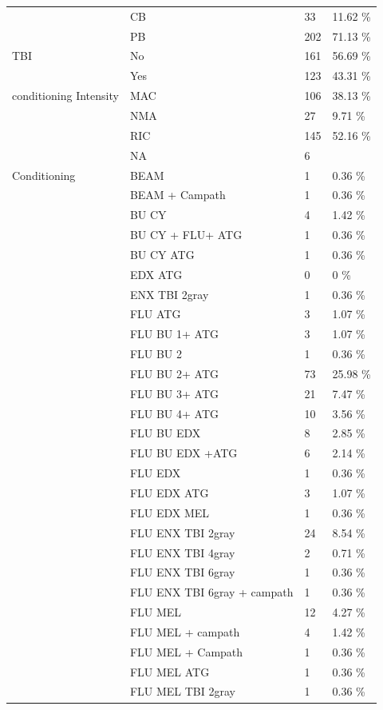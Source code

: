 \documentclass[a4paper,11pt] {article}
\begin{document}
\begin{longtable}{llll}
   & CB & 33 & 11.62 \% \\ 
   & PB & 202 & 71.13 \% \\ 
  TBI & No & 161 & 56.69 \% \\ 
   & Yes & 123 & 43.31 \% \\ 
  conditioning Intensity & MAC & 106 & 38.13 \% \\ 
   & NMA & 27 & 9.71 \% \\ 
   & RIC & 145 & 52.16 \% \\ 
   & NA & 6 &  \\ 
  Conditioning & BEAM & 1 & 0.36 \% \\ 
   & BEAM + Campath & 1 & 0.36 \% \\ 
   & BU CY  & 4 & 1.42 \% \\ 
   & BU CY + FLU+ ATG & 1 & 0.36 \% \\ 
   & BU CY ATG & 1 & 0.36 \% \\ 
   & EDX ATG & 0 & 0 \% \\ 
   & ENX TBI 2gray & 1 & 0.36 \% \\ 
   & FLU ATG & 3 & 1.07 \% \\ 
   & FLU BU 1+ ATG & 3 & 1.07 \% \\ 
   & FLU BU 2 & 1 & 0.36 \% \\ 
   & FLU BU 2+ ATG & 73 & 25.98 \% \\ 
   & FLU BU 3+ ATG & 21 & 7.47 \% \\ 
   & FLU BU 4+ ATG & 10 & 3.56 \% \\ 
   & FLU BU EDX & 8 & 2.85 \% \\ 
   & FLU BU EDX +ATG & 6 & 2.14 \% \\ 
   & FLU EDX & 1 & 0.36 \% \\ 
   & FLU EDX ATG & 3 & 1.07 \% \\ 
   & FLU EDX MEL & 1 & 0.36 \% \\ 
   & FLU ENX TBI 2gray & 24 & 8.54 \% \\ 
   & FLU ENX TBI 4gray & 2 & 0.71 \% \\ 
   & FLU ENX TBI 6gray & 1 & 0.36 \% \\ 
   & FLU ENX TBI 6gray + campath & 1 & 0.36 \% \\ 
   & FLU MEL & 12 & 4.27 \% \\ 
   & FLU MEL + campath & 4 & 1.42 \% \\ 
   & FLU MEL + Campath & 1 & 0.36 \% \\ 
   & FLU MEL ATG & 1 & 0.36 \% \\ 
   & FLU MEL TBI 2gray & 1 & 0.36 \% \\ 

\end{longtable}
\end{document}
